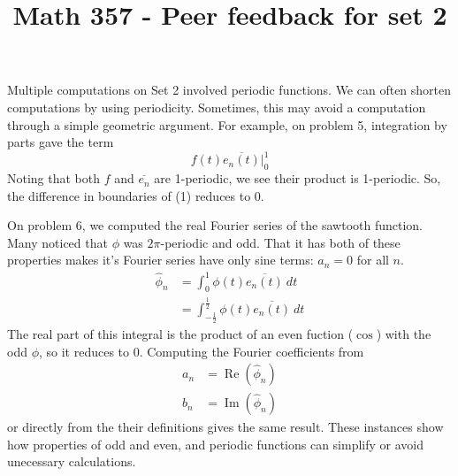 \documentclass[12pt, reqno]{amsart}
\theoremstyle{definition}
\theoremstyle{remark}
\DeclareMathOperator{\re}{Re}
\DeclareMathOperator{\im}{Im}
\begin{document}
\title[Math 357 - Harmonic Analysis]{Math 357 - Peer feedback for set 2}   




\maketitle

\section*{}


Multiple computations on Set 2 involved periodic functions. We can often shorten computations by using periodicity. Sometimes, this may avoid a computation through a simple geometric argument. For example, on problem 5, integration by parts gave the term \begin{equation}
  f(t)\overline{e_n(t)}\bigg\rvert_0^1
\end{equation}Noting that both $f$ and $\overline{e_n}$ are 1-periodic, we see their product is 1-periodic. So, the difference in boundaries of (1) reduces to 0.


On problem 6, we computed the real Fourier series of the sawtooth function. Many noticed that $\phi$ was $2\pi$-periodic and odd. That it has both of these properties makes it's Fourier series have only sine terms: $a_n=0$ for all $n$. \begin{align*}
\hat \phi_n&=\int_0^1 \phi(t)\overline{e_n(t)}\ dt\\
&=\int_{-\frac{1}{2}}^{\frac{1}{2}}\phi(t)\overline{e_n(t)}\ dt
\end{align*}
The real part of this integral is the product of an even fuction ($\cos$) with the odd $\phi$, so it reduces to 0. Computing the Fourier coefficients from \begin{align}
  a_n&=\re(\hat\phi_n)\\
  b_n&=\im(\hat\phi_n)
\end{align}or directly from the their definitions gives the same result. These instances show how properties of odd and even, and periodic functions can simplify or avoid unecessary calculations. 
\end{document}
